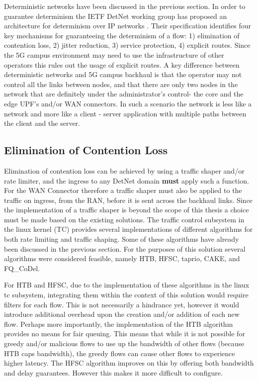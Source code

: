 Deterministic networks have been discussed in the previous section. In order to guarantee determinism the IETF DetNet working group has proposed an architecture for determinism over IP networks \cite{detnet-arch}. Their specification identifies four key mechanisms for guaranteeing the determinism of a flow: 1) elimination of contention loss, 2) jitter reduction, 3) service protection, 4) explicit routes. Since the 5G campus environment may need to use the infrastructure of other operators this rules out the usage of explicit routes. A key difference between deterministic networks and 5G campus backhaul is that the operator may not control all the links between nodes, and that there are only two nodes in the network that are definitely under the administrator's control- the core and the edge UPF's and/or WAN connectors. In such a scenario the network is less like a network and more like a client - server application with multiple paths between the client and the server.

\subsection{Elimination of Contention Loss}

Elimination of contention loss can be achieved by using a traffic shaper and/or rate limiter, and the ingress to any DetNet domain \textbf{must} apply such a function. For the WAN Connector therefore a traffic shaper must also be applied to the traffic on ingress, from the RAN, before it is sent across the backhaul links. Since the implementation of a traffic shaper is beyond the scope of this thesis a choice must be made based on the existing solutions. The traffic control subsystem in the linux kernel (TC) provides several implementations of different algorithms for both rate limiting and traffic shaping. Some of these algorithms have already been discussed in the previous section. For the purposes of this solution several algorithms were considered feasible, namely HTB, HFSC, taprio, CAKE, and FQ\_CoDel.

For HTB and HFSC, due to the implementation of these algorithms in the linux tc subsystem, integrating them within the context of this solution would require filters for each flow. This is not necessarily a hindrance yet, however it would introduce additional overhead upon the creation and/or addition of each new flow. Perhaps more importantly, the implementation of the HTB algorithm provides no means for fair queuing. This means that while it is not possible for greedy and/or malicious flows to use up the bandwidth of other flows (because HTB caps bandwidth), the greedy flows can cause other flows to experience higher latency. The HFSC algorithm improves on this by offering both bandwidth and delay guarantees. However this makes it more difficult to configure.

